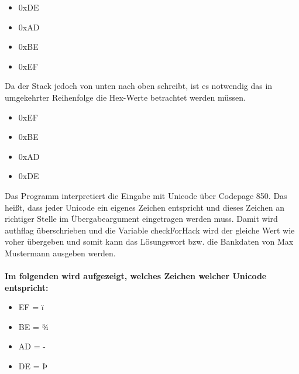 \begin{itemize}
\item 0xDE
\item 0xAD
\item 0xBE
\item 0xEF
\end{itemize}
Da der Stack jedoch von unten nach oben schreibt, ist es notwendig das in umgekehrter Reihenfolge die Hex-Werte betrachtet werden müssen.
\begin{itemize}
\item 0xEF
\item 0xBE
\item 0xAD
\item 0xDE
\end{itemize}
Das Programm interpretiert die Eingabe mit Unicode über Codepage 850. Das heißt, dass jeder Unicode ein eigenes Zeichen entspricht und dieses Zeichen an richtiger Stelle im Übergabeargument eingetragen werden muss. Damit wird authflag überschrieben und die Variable checkForHack wird der gleiche Wert wie voher übergeben und somit kann das Lösungswort bzw. die Bankdaten von Max Mustermann ausgeben werden.\\\\\textbf{Im folgenden wird aufgezeigt, welches Zeichen welcher Unicode entspricht:}
\begin{itemize}
\item EF = ï
\item BE = ¾
\item AD = -
\item DE = Þ
\end{itemize}

